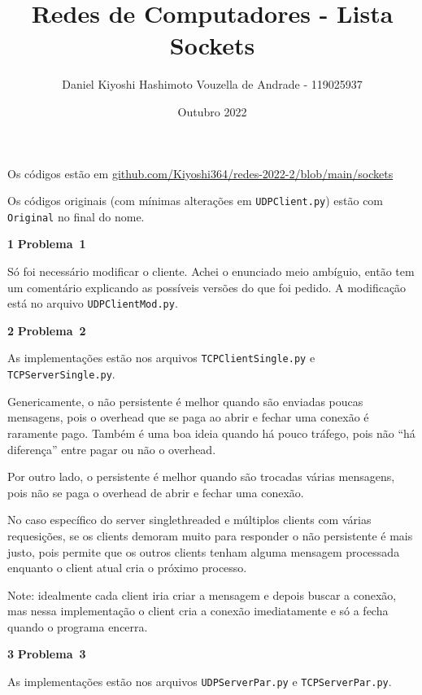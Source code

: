 \documentclass{article}
\title{Redes de Computadores - Lista Sockets}
\author{Daniel Kiyoshi Hashimoto Vouzella de Andrade - 119025937}
\date{Outubro 2022}
\newcounter{exe-list}
\newenvironment{exe}[2][Problema]
    {\newcommand{\opt}{(Opcional)}%
    \newcommand{\sketch}[1]{{\bfseries Rascunho:} ##1}%
    \medskip\par\noindent\ifthenelse{\equal{#1}{}}
        {\textbf{\large #2}}
        {\textbf{\large #1~#2}}%
    \medskip\par\noindent}
    {\medskip}
\begin{document}
\maketitle

Os códigos estão em
\href{https://github.com/Kiyoshi364/redes-2022-2/blob/main/sockets}
{github.com/Kiyoshi364/redes-2022-2/blob/main/sockets}

Os códigos originais (com mínimas alterações em \texttt{UDPClient.py})
estão com \texttt{Original} no final do nome.
\bigskip

\begin{exe}{1}
    Só foi necessário modificar o cliente.
    Achei o enunciado meio ambíguio,
    então tem um comentário explicando as possíveis
    versões do que foi pedido.
    A modificação está no arquivo \texttt{UDPClientMod.py}.
\end{exe}

\begin{exe}{2}
    As implementações estão nos arquivos
    \texttt{TCPClientSingle.py} e \texttt{TCPServerSingle.py}.

    Genericamente, o não persistente é melhor quando
    são enviadas poucas mensagens,
    pois o overhead que se paga ao abrir e fechar uma conexão
    é raramente pago.
    Também é uma boa ideia quando há pouco tráfego,
    pois não ``há diferença'' entre pagar ou não o overhead.

    Por outro lado, o persistente é melhor quando
    são trocadas várias mensagens,
    pois não se paga o overhead de abrir e fechar uma conexão.

    No caso específico do server singlethreaded e
    múltiplos clients com várias requesições,
    se os clients demoram muito para responder
    o não persistente é mais justo,
    pois permite que os outros clients tenham alguma
    mensagem processada enquanto o client atual cria
    o próximo processo.

    Note: idealmente cada client iria criar a mensagem e
    depois buscar a conexão,
    mas nessa implementação o client cria a conexão imediatamente
    e só a fecha quando o programa encerra.
\end{exe}

\begin{exe}{3}
    As implementações estão nos arquivos
    \texttt{UDPServerPar.py} e \texttt{TCPServerPar.py}.
\end{exe}
\end{document}

